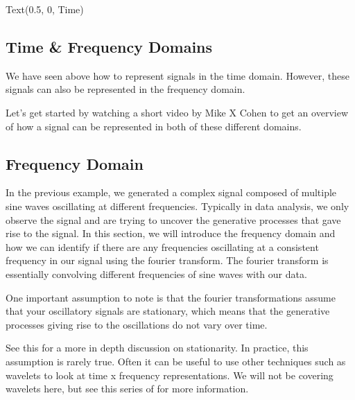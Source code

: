 \documentclass[letterpaper,10pt,english]{sphinxmanual}
\begin{document}
\begin{sphinxVerbatim}[commandchars=\\\{\}]
Text(0.5, 0, \PYGZsq{}Time\PYGZsq{})
\end{sphinxVerbatim}

\noindent{}


\subsection{Time \& Frequency Domains}
\label{\detokenize{content/Signal_Processing:time-frequency-domains}}
We have seen above how to represent signals in the time domain. However, these signals can also be represented in the frequency domain.

Let’s get started by watching a short video by Mike X Cohen to get an overview of how a signal can be represented in both of these different domains.

\begin{sphinxVerbatim}[commandchars=\\\{\}]
\end{sphinxVerbatim}

\noindent{}


\subsection{Frequency Domain}
\label{\detokenize{content/Signal_Processing:frequency-domain}}
In the previous example, we generated a complex signal composed of multiple sine waves oscillating at different frequencies. Typically in data analysis, we only observe the signal and are trying to uncover the generative processes that gave rise to the signal.  In this section, we will introduce the frequency domain and how we can identify if there are any frequencies oscillating at a consistent frequency in our signal using the fourier transform. The fourier transform is essentially convolving different frequencies of sine waves with our data.

One important assumption to note is that the fourier transformations assume that your oscillatory signals are stationary, which means that the generative processes giving rise to the oscillations do not vary over time.

See this  for a more in depth discussion on stationarity.  In practice, this assumption is rarely true.  Often it can be useful to use other techniques such as wavelets to look at time x frequency representations. We will not be covering wavelets here, but see this series of  for more information.
\end{document}
